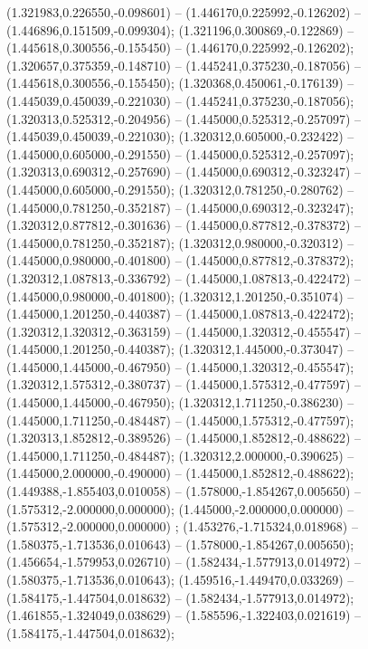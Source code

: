  (1.321983,0.226550,-0.098601) -- (1.446170,0.225992,-0.126202) -- (1.446896,0.151509,-0.099304);
 (1.321196,0.300869,-0.122869) -- (1.445618,0.300556,-0.155450) -- (1.446170,0.225992,-0.126202);
 (1.320657,0.375359,-0.148710) -- (1.445241,0.375230,-0.187056) -- (1.445618,0.300556,-0.155450);
 (1.320368,0.450061,-0.176139) -- (1.445039,0.450039,-0.221030) -- (1.445241,0.375230,-0.187056);
 (1.320313,0.525312,-0.204956) -- (1.445000,0.525312,-0.257097) -- (1.445039,0.450039,-0.221030);
 (1.320312,0.605000,-0.232422) -- (1.445000,0.605000,-0.291550) -- (1.445000,0.525312,-0.257097);
 (1.320313,0.690312,-0.257690) -- (1.445000,0.690312,-0.323247) -- (1.445000,0.605000,-0.291550);
 (1.320312,0.781250,-0.280762) -- (1.445000,0.781250,-0.352187) -- (1.445000,0.690312,-0.323247);
 (1.320312,0.877812,-0.301636) -- (1.445000,0.877812,-0.378372) -- (1.445000,0.781250,-0.352187);
 (1.320312,0.980000,-0.320312) -- (1.445000,0.980000,-0.401800) -- (1.445000,0.877812,-0.378372);
 (1.320312,1.087813,-0.336792) -- (1.445000,1.087813,-0.422472) -- (1.445000,0.980000,-0.401800);
 (1.320312,1.201250,-0.351074) -- (1.445000,1.201250,-0.440387) -- (1.445000,1.087813,-0.422472);
 (1.320312,1.320312,-0.363159) -- (1.445000,1.320312,-0.455547) -- (1.445000,1.201250,-0.440387);
 (1.320312,1.445000,-0.373047) -- (1.445000,1.445000,-0.467950) -- (1.445000,1.320312,-0.455547);
 (1.320312,1.575312,-0.380737) -- (1.445000,1.575312,-0.477597) -- (1.445000,1.445000,-0.467950);
 (1.320312,1.711250,-0.386230) -- (1.445000,1.711250,-0.484487) -- (1.445000,1.575312,-0.477597);
 (1.320313,1.852812,-0.389526) -- (1.445000,1.852812,-0.488622) -- (1.445000,1.711250,-0.484487);
 (1.320312,2.000000,-0.390625) -- (1.445000,2.000000,-0.490000) -- (1.445000,1.852812,-0.488622);
 (1.449388,-1.855403,0.010058) -- (1.578000,-1.854267,0.005650) -- (1.575312,-2.000000,0.000000);
 (1.445000,-2.000000,0.000000) -- (1.575312,-2.000000,0.000000) ;
 (1.453276,-1.715324,0.018968) -- (1.580375,-1.713536,0.010643) -- (1.578000,-1.854267,0.005650);
 (1.456654,-1.579953,0.026710) -- (1.582434,-1.577913,0.014972) -- (1.580375,-1.713536,0.010643);
 (1.459516,-1.449470,0.033269) -- (1.584175,-1.447504,0.018632) -- (1.582434,-1.577913,0.014972);
 (1.461855,-1.324049,0.038629) -- (1.585596,-1.322403,0.021619) -- (1.584175,-1.447504,0.018632);
